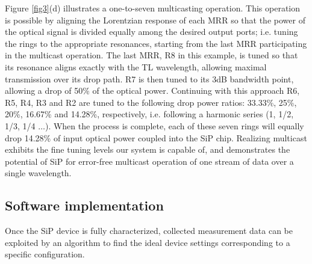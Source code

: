 Figure \ref{fig3}(d) illustrates a one-to-seven multicasting operation. This operation is possible by aligning the Lorentzian response of each MRR so that the power of the optical signal is divided equally among the desired output ports; i.e. tuning the rings to the appropriate resonances, starting from the last MRR participating in the multicast operation. The last MRR, R8 in this example, is tuned so that its resonance aligns exactly with the TL wavelength, allowing maximal transmission over its drop path. R7 is then tuned to its 3dB bandwidth point, allowing a drop of 50\% of the optical power. Continuing with this approach R6, R5, R4, R3 and R2 are tuned to the following drop power ratios: 33.33\%, 25\%, 20\%, 16.67\% and 14.28\%, respectively, i.e. following a harmonic series (1, 1/2, 1/3, 1/4 $\dots$). When the process is complete, each of these seven rings will equally drop 14.28\% of input optical power coupled into the SiP chip. Realizing multicast exhibits the fine tuning levels our system is capable of, and demonstrates the potential of SiP for error-free multicast operation of one stream of data over a single wavelength.


\subsection{Software implementation }

Once the SiP device is fully characterized, collected measurement data can be exploited by an algorithm to find the ideal device settings corresponding to a specific configuration.

